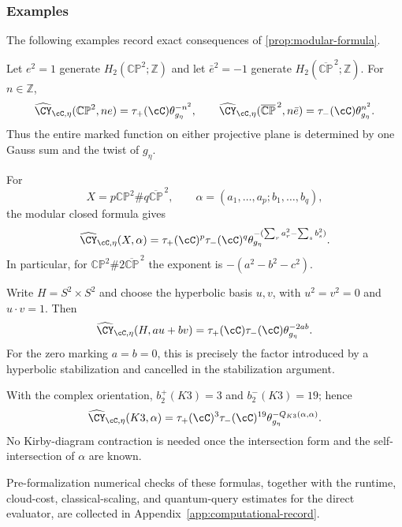 \subsubsection{Examples}
\label{subsubsec:modular-examples}

The following examples record exact consequences of
\cref{prop:modular-formula}.
\par\medskip

\begin{example}
\label{ex:projective-planes}
Let $e^2=1$ generate $H_2(\mathbb{CP}^2;\mathbb Z)$ and let
$\bar e^2=-1$ generate $H_2(\overline{\mathbb{CP}}^{\,2};\mathbb Z)$.  For
$n\in\mathbb Z$,
\[
  \widehat{\CY}_{\cC,\eta}(\mathbb{CP}^2,ne)
    =\tau_+(\cC)\theta_{g_\eta}^{-n^2},
  \qquad
  \widehat{\CY}_{\cC,\eta}(\overline{\mathbb{CP}}^{\,2},n\bar e)
    =\tau_-(\cC)\theta_{g_\eta}^{n^2}.
\]
Thus the entire marked function on either projective plane is determined by
one Gauss sum and the twist of $g_\eta$.
\end{example}

\begin{example}
\label{ex:diagonal-rational-surfaces}
For
\[
 X=p\mathbb{CP}^2\#q\overline{\mathbb{CP}}^{\,2},
 \qquad
 \alpha=(a_1,\ldots,a_p;b_1,\ldots,b_q),
\]
the modular closed formula gives
\[
 \widehat{\CY}_{\cC,\eta}(X,\alpha)
 =\tau_+(\cC)^p\tau_-(\cC)^q
  \theta_{g_\eta}^{-
    (\sum_r a_r^2-\sum_s b_s^2)}.
\]
In particular, for $\mathbb{CP}^2\#2\overline{\mathbb{CP}}^{\,2}$ the
exponent is $-(a^2-b^2-c^2)$.
\end{example}

\begin{example}
\label{ex:s2xs2}
Write $H=S^2\times S^2$ and choose the hyperbolic basis $u,v$, with
$u^2=v^2=0$ and $u\cdot v=1$.  Then
\[
  \widehat{\CY}_{\cC,\eta}(H,au+bv)
  =\tau_+(\cC)\tau_-(\cC)\theta_{g_\eta}^{-2ab}.
\]
For the zero marking $a=b=0$, this is precisely the factor introduced by a
hyperbolic stabilization and cancelled in the stabilization argument.
\end{example}

\begin{example}[$K3$]
\label{ex:k3-modular}
With the complex orientation, $b_2^+(K3)=3$ and $b_2^-(K3)=19$; hence
\[
  \widehat{\CY}_{\cC,\eta}(K3,\alpha)
  =\tau_+(\cC)^3\tau_-(\cC)^{19}
   \theta_{g_\eta}^{-Q_{K3}(\alpha,\alpha)}.
\]
No Kirby-diagram contraction is needed once the intersection form and the
self-intersection of $\alpha$ are known.
\end{example}

Pre-formalization numerical checks of these formulas, together with the
runtime, cloud-cost, classical-scaling, and quantum-query estimates for the
direct evaluator, are collected in
Appendix~\ref{app:computational-record}.
